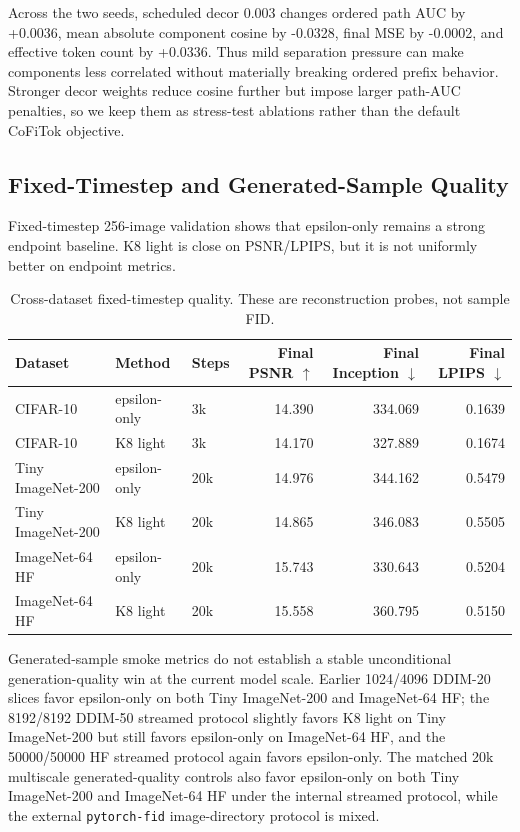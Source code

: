 \documentclass[11pt]{article}
\newcommand{\method}{CoFiTok}
\begin{document}
Across the two seeds, scheduled decor 0.003 changes ordered path AUC by +0.0036,
mean absolute component cosine by -0.0328, final MSE by -0.0002, and effective
token count by +0.0336. Thus mild separation pressure can make components less
correlated without materially breaking ordered prefix behavior. Stronger decor
weights reduce cosine further but impose larger path-AUC penalties, so we keep
them as stress-test ablations rather than the default \method{} objective.

\subsection{Fixed-Timestep and Generated-Sample Quality}

Fixed-timestep 256-image validation shows that epsilon-only remains a strong
endpoint baseline. K8 light is close on PSNR/LPIPS, but it is not uniformly
better on endpoint metrics.

\begin{table}[t]
  \centering
  \caption{Cross-dataset fixed-timestep quality. These are reconstruction probes,
  not sample FID.}
  \label{tab:quality}
  \begin{tabular}{lllrrr}
    \toprule
    Dataset & Method & Steps & Final PSNR $\uparrow$ & Final Inception $\downarrow$ & Final LPIPS $\downarrow$ \\
    \midrule
    CIFAR-10 & epsilon-only & 3k & 14.390 & 334.069 & 0.1639 \\
    CIFAR-10 & K8 light & 3k & 14.170 & 327.889 & 0.1674 \\
    Tiny ImageNet-200 & epsilon-only & 20k & 14.976 & 344.162 & 0.5479 \\
    Tiny ImageNet-200 & K8 light & 20k & 14.865 & 346.083 & 0.5505 \\
    ImageNet-64 HF & epsilon-only & 20k & 15.743 & 330.643 & 0.5204 \\
    ImageNet-64 HF & K8 light & 20k & 15.558 & 360.795 & 0.5150 \\
    \bottomrule
  \end{tabular}
\end{table}

Generated-sample smoke metrics do not establish a stable unconditional
generation-quality win at the current model scale. Earlier 1024/4096 DDIM-20
slices favor epsilon-only on both Tiny ImageNet-200 and ImageNet-64 HF; the
8192/8192 DDIM-50 streamed protocol slightly favors K8 light on Tiny
ImageNet-200 but still favors epsilon-only on ImageNet-64 HF, and the
50000/50000 HF streamed protocol again favors epsilon-only. The matched 20k
multiscale generated-quality controls also favor epsilon-only on both Tiny
ImageNet-200 and ImageNet-64 HF under the internal streamed protocol, while the
external \texttt{pytorch-fid} image-directory protocol is mixed.
\end{document}
